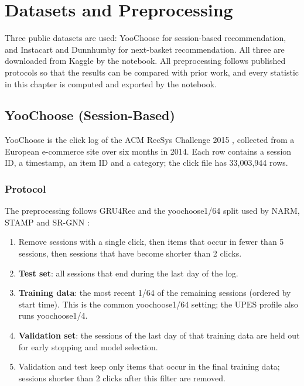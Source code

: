\chapter{Datasets and Preprocessing}
\label{ch:data}

Three public datasets are used: YooChoose for session-based recommendation, and
Instacart and Dunnhumby for next-basket recommendation. All three are downloaded
from Kaggle by the notebook. All preprocessing follows published protocols so
that the results can be compared with prior work, and every statistic in this
chapter is computed and exported by the notebook.

\section{YooChoose (Session-Based)}

YooChoose is the click log of the ACM RecSys Challenge 2015 \cite{benshimon2015},
collected from a European e-commerce site over six months in 2014. Each row
contains a session ID, a timestamp, an item ID and a category; the click file has
33,003,944 rows.

\subsection{Protocol}

The preprocessing follows GRU4Rec \cite{hidasi2016} and the yoochoose1/64 split
used by NARM, STAMP and SR-GNN \cite{li2017,liu2018,wu2019}:

\begin{enumerate}
    \item Remove sessions with a single click, then items that occur in fewer than
          5 sessions, then sessions that have become shorter than 2 clicks.
    \item \textbf{Test set}: all sessions that end during the last day of the log.
    \item \textbf{Training data}: the most recent 1/64 of the remaining sessions
          (ordered by start time). This is the common yoochoose1/64 setting; the
          UPES profile also runs yoochoose1/4.
    \item \textbf{Validation set}: the sessions of the last day of that training
          data are held out for early stopping and model selection.
    \item Validation and test keep only items that occur in the final training
          data; sessions shorter than 2 clicks after this filter are removed.
\end{enumerate}

